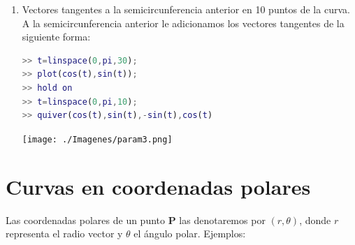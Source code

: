 \begin{enumerate}
\item Vectores tangentes a la semicircunferencia anterior en 10 puntos de la curva. A la semicircunferencia anterior le adicionamos los vectores tangentes de la siguiente forma:
\begin{lstlisting}[language=Matlab]
>> t=linspace(0,pi,30); 
>> plot(cos(t),sin(t));
>> hold on  
>> t=linspace(0,pi,10); 
>> quiver(cos(t),sin(t),-sin(t),cos(t)
\end{lstlisting}
\begin{center}
\texttt{[image: ./Imagenes/param3.png]}
\end{center} 
\end{enumerate}

\section{Curvas en coordenadas polares}

Las coordenadas polares de un punto \textbf{P} las denotaremos por $(r,\theta)$, donde $r$ representa el radio vector y $\theta$ el ángulo polar. Ejemplos:

